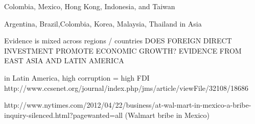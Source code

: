 \documentclass[12pt]{article}
\begin{document}
Colombia, Mexico, Hong Kong, Indonesia, and Taiwan

Argentina, Brazil,Colombia, Korea, Malaysia, Thailand in Asia

Evidence is mixed across regions / countries DOES FOREIGN DIRECT INVESTMENT PROMOTE ECONOMIC GROWTH? EVIDENCE FROM EAST ASIA AND LATIN AMERICA 

in Latin America, high corruption = high FDI http://www.ccsenet.org/journal/index.php/jms/article/viewFile/32108/18686

http://www.nytimes.com/2012/04/22/business/at-wal-mart-in-mexico-a-bribe-inquiry-silenced.html?pagewanted=all (Walmart bribe in Mexico)

\clearpage


\end{document}
